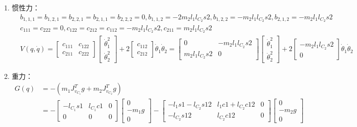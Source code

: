 \documentclass[
12pt, %
a4paper, 
oneside, %
headinclude,footinclude, %
]{scrartcl}
\begin{document}
{\begin{enumerate}
\begin{align*}
&= \begin{bmatrix} m_1l_{C_1}^2 + I_{zz1} + m_2(l_1^2 + l_{C_2}^2 + 2l_1 l_{C_2}c_2) + I_{zz2} & m_2(l_{C_2}^2 + l_1 l_{C_2}c2) + I_{zz2} \\ m_2(l_{C_2}^2 + l_1 l_{C_2}c2) + I_{zz2} & m_2 l_{C_2}^2 + I_{zz2} \end{bmatrix}
\end{align*}
\item 惯性力：
\begin{align*}
&b_{1,1,1} = b_{1,2,1} = b_{2,2,1} = b_{2,1,1} = b_{2,2,2} = 0, b_{1,1,2} = -2m_2 l_1 l_{C_2}s2, b_{1,2,2} = -m_2 l_1 l_{C_2}s2, b_{2,1,2} = -m_2 l_1 l_{C_2}s2 \\
&c_{111} = c_{222} = 0, c_{122} = c_{212} = c_{112} = -m_2 l_1 l_{C_2}s2, c_{211} = m_2 l_1 l_{C_2}s2 \\
&V(q, \dot{q}) = \begin{bmatrix} c_{111} & c_{122} \\ c_{211} & c_{222} \end{bmatrix} \begin{bmatrix} \dot{\theta}_1^2 \\ \dot{\theta}_2^2 \end{bmatrix} + 2\begin{bmatrix} c_{112} \\ c_{212} \end{bmatrix} \dot{\theta}_1\dot{\theta}_2 = \begin{bmatrix} 0 & -m_2 l_1 l_{C_2}s2 \\ m_2 l_1 l_{C_2}s2 & 0 \end{bmatrix} \begin{bmatrix} \dot{\theta}_1^2 \\ \dot{\theta}_2^2 \end{bmatrix} + 2\begin{bmatrix} -m_2 l_1 l_{C_2}s2 \\ 0 \end{bmatrix} \dot{\theta}_1 \dot{\theta}_2
\end{align*}
\item 重力：
\begin{align*}
G(q) &= -(m_1 J_{v_{C_1}}^T g + m_2 J_{v_{C_2}}^T g) \\
&= -\begin{bmatrix} -l_{C_1}s1 & l_{C_1}c1 & 0 \\ 0 & 0 & 0 \end{bmatrix} \begin{bmatrix} 0 \\ -m_1 g \\ 0 \end{bmatrix} - \begin{bmatrix} -l_1 s1 - l_{C_2}s12 & l_1 c1 + l_{C_2}c12 & 0 \\ -l_{C_2}s12 & l_{C_2}c12 & 0 \end{bmatrix} \begin{bmatrix} 0 \\ -m_2 g \\ 0 \end{bmatrix} \\

\end{align*}
\end{enumerate}}
\end{document}
